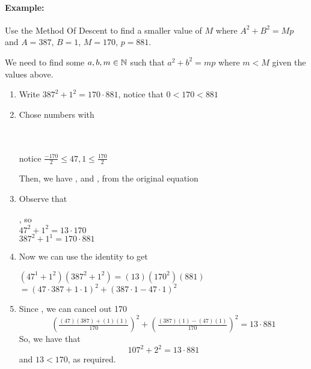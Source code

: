 \documentclass[../main.tex]{subfiles}
\begin{document}
\paragraph{Example:} Use the Method Of Descent to find a smaller value of $M$ where $A^2+B^2=Mp$ and $A=387$, $B=1$, $M=170$, $p=881$.
\begin{ans}
    We need to find some $a,b,m \in \mathbb{N}$ such that $a^2+b^2=mp$ where $m < M$ given the values above. \sspace
    \begin{enumerate}
        \item Write $387^2+1^2=170\cdot881$, notice that $0 < 170 < 881$
        \item Chose numbers with \\
            \begin{center}
                 \\
                 \\
                notice $\tfrac{-170}{2} \leq 47,1 \leq \tfrac{170}{2}$
            \end{center}
            Then, we have , and , from the original equation
        \item Observe that \\
            \begin{center}
                , so \\
                $47^2+1^2=13\cdot170$ \\
                $387^2+1^1=170\cdot881$
            \end{center}
    \end{enumerate}
\end{ans}
\begin{ans}
    \begin{enumerate}
    \setcounter{enumi}{3}
        \item Now we can use the identity to get
            \begin{center}
                $(47^1+1^2)(387^2+1^2)=(13)(170^2)(881)$ \\
                $=(47\cdot387+1\cdot1)^2+(387\cdot1-47\cdot1)^2$
            \end{center}
        \item Since , we can cancel out 170
        $$(\tfrac{(47)(387)+(1)(1)}{170})^2+(\tfrac{(387)(1)-(47)(1)}{170})^2=13\cdot881$$ So, we have that $$107^2+2^2=13\cdot881$$ and $13 < 170$, as required.
    \end{enumerate}
\end{ans}
\end{document}
